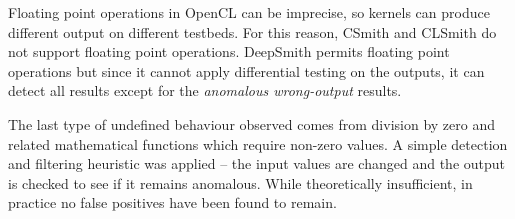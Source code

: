 Floating point operations in OpenCL can be imprecise, so kernels can produce different output on different testbeds. For this reason, CSmith and CLSmith do not support floating point operations. DeepSmith permits floating point operations but since it cannot apply differential testing on the outputs, it can detect all results except for the \emph{anomalous wrong-output} results.

The last type of undefined behaviour observed comes from division by zero and related mathematical functions which require non-zero values. A simple detection and filtering heuristic was applied -- the input values are changed and the output is checked to see if it remains anomalous. While theoretically insufficient, in practice no false positives have been found to remain.
